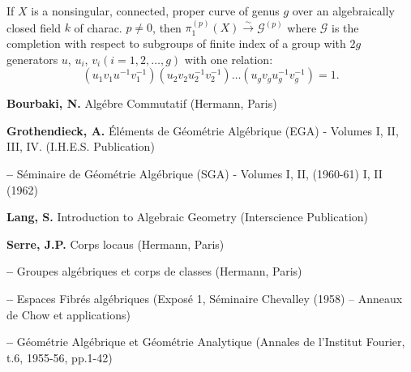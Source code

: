 \setcounter{thm}{3}
\begin{thm}
If $X$ is a nonsingular, connected, proper curve of genus $g$ over an
algebraically closed field $k$ of charac. $p\neq 0$, then
$\pi^{(p)}_{1}(X)\xrightarrow{\sim}\mathscr{G}^{(p)}$ where
$\mathscr{G}$ is the completion with respect to subgroups of finite
index of a group with $2g$ generators $u$, $u_{i}$, $v_{i}
(i=1,2,\ldots,g)$ with one relation:
$$
(u_{1}v_{1}u^{-1}v^{-1}_{1})(u_{2}v_{2}u^{-1}_{2}v^{-1}_{2})\ldots
(u_{g}v_{g}u^{-1}_{g}v^{-1}_{g})=1. 
$$
\end{thm}

\begin{thebibliography}{99}
 {\bf Bourbaki, N.} Alg\'ebre Commutatif (Hermann,
Paris)

 {\bf Grothendieck, A.} \'El\'ements de G\'eom\'etrie
Alg\'ebrique (EGA) - Volumes I, II, III, IV. (I.H.E.S. Publication)

 {\bf -- } S\'eminaire de G\'eom\'etrie Alg\'ebrique
(SGA) - Volumes I, II, (1960-61) I, II (1962)

 {\bf Lang, S.} Introduction to Algebraic Geometry
(Interscience Publication)

 {\bf Serre, J.P.} Corps locaus (Hermann, Paris)

 {\bf -- } Groupes alg\'ebriques et corps de classes
(Hermann, Paris)

 {\bf --} Espaces Fibr\'es alg\'ebriques (Expos\'e 1,
S\'eminaire Chevalley (1958) -- Anneaux de Chow et applications)

 {\bf -- } G\'eom\'etrie Alg\'ebrique et G\'eom\'etrie
Analytique (Annales de l'Institut Fourier, t.6, 1955-56, pp.1-42)

\end{thebibliography}

\label{addchap9}
